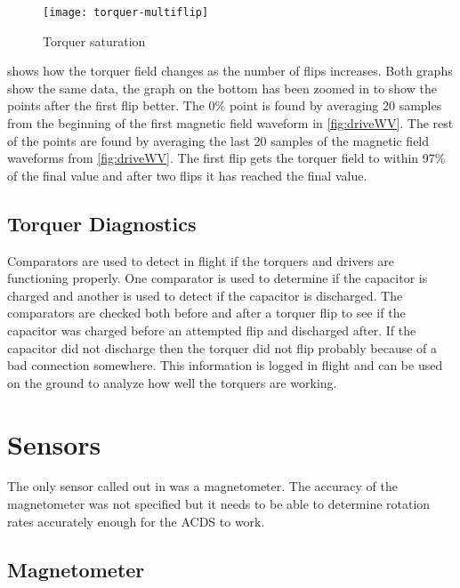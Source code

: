 \begin{figure}[H]
    \centering
    \texttt{[image: torquer-multiflip]}
    \caption{Torquer saturation}
    \label{fig:satWV}
\end{figure}

 shows how the torquer field changes as the number of flips increases. Both graphs show the same data, the graph on the bottom has been zoomed in to show the points after the first flip better. The 0\% point is found by averaging 20 samples from the beginning of the first magnetic field waveform in \cref{fig:driveWV}. The rest of the points are found by averaging the last 20 samples of the magnetic field waveforms from \cref{fig:driveWV}. The first flip gets the torquer field to within 97\% of the final value and after two flips it has reached the final value. 

\subsection{Torquer Diagnostics}

Comparators are used to detect in flight if the torquers and drivers are functioning properly. One comparator is used to determine if the capacitor is charged and another is used to detect if the capacitor is discharged. The comparators are checked both before and after a torquer flip to see if the capacitor was charged before an attempted flip and discharged after. If the capacitor did not discharge then the torquer did not flip probably because of a bad connection somewhere. This information is logged in flight and can be used on the ground to analyze how well the torquers are working.



\section{Sensors}

The only sensor called out in \cite{Mentch11} was a magnetometer. The accuracy of the magnetometer was not specified but it needs to be able to determine rotation rates accurately enough for the \ac{ACDS} to work.

\subsection{Magnetometer}

